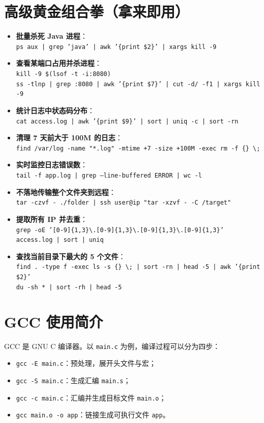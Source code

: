 \section{高级黄金组合拳（拿来即用）}
\begin{itemize}
\item \textbf{批量杀死 Java 进程}：\\ \texttt{ps aux | grep 'java' | awk '\{print \$2\}' | xargs kill -9}
\item \textbf{查看某端口占用并杀进程}：\\ \texttt{kill -9 \$(lsof -t -i:8080)} \\ \texttt{ss -tlnp | grep :8080 | awk '\{print \$7\}' | cut -d/ -f1 | xargs kill -9}
\item \textbf{统计日志中状态码分布}：\\ \texttt{cat access.log | awk '\{print \$9\}' | sort | uniq -c | sort -rn}
\item \textbf{清理 7 天前大于 100M 的日志}：\\ \texttt{find /var/log -name "*.log" -mtime +7 -size +100M -exec rm -f \{\} \textbackslash;}
\item \textbf{实时监控日志错误数}：\\ \texttt{tail -f app.log | grep --line-buffered ERROR | wc -l}
\item \textbf{不落地传输整个文件夹到远程}：\\ \texttt{tar -czvf - ./folder | ssh user@ip "tar -xzvf - -C /target"}
\item \textbf{提取所有 IP 并去重}：\\ \texttt{grep -oE '[0-9]\{1,3\}\textbackslash.[0-9]\{1,3\}\textbackslash.[0-9]\{1,3\}\textbackslash.[0-9]\{1,3\}' access.log | sort | uniq}
\item \textbf{查找当前目录下最大的 5 个文件}：\\ \texttt{find . -type f -exec ls -s \{\} \textbackslash; | sort -rn | head -5 | awk '\{print \$2\}'} \\ \texttt{du -sh * | sort -rh | head -5}
\end{itemize}

\section{GCC 使用简介}

GCC 是 GNU C 编译器。以 \texttt{main.c} 为例，编译过程可以分为四步：

\begin{itemize}
\item \texttt{gcc -E main.c}：预处理，展开头文件与宏；
\item \texttt{gcc -S main.c}：生成汇编 \texttt{main.s}；
\item \texttt{gcc -c main.c}：汇编并生成目标文件 \texttt{main.o}；
\item \texttt{gcc main.o -o app}：链接生成可执行文件 \texttt{app}。
\end{itemize}

